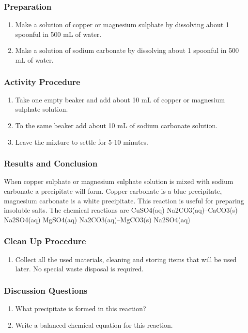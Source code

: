 \subsubsection*{Preparation}
\begin{enumerate}
\item{Make a solution of copper or magnesium sulphate by dissolving about 1 spoonful in 500 mL of water.}
\item{Make a solution of sodium carbonate by dissolving about 1 spoonful in 500 mL of water.}
\end{enumerate}

\subsubsection*{Activity Procedure}
\begin{enumerate}
\item{Take one empty beaker and add about 10 mL of copper or magnesium sulphate solution.}
\item{To the same beaker add about 10 mL of sodium carbonate solution.}
\item{Leave the mixture to settle for 5-10 minutes.}
\end{enumerate}

\subsubsection*{Results and Conclusion}
When copper sulphate or magnesium sulphate solution is mixed with sodium carbonate a precipitate will form. Copper carbonate is a blue precipitate, magnesium carbonate is a white precipitate. This reaction is useful for preparing insoluble salts.
The chemical reactions are 
CuSO4(aq) Na2CO3(aq)--CaCO3(s) Na2SO4(aq)
MgSO4(aq) Na2CO3(aq)--MgCO3(s) Na2SO4(aq)

\subsubsection*{Clean Up Procedure}
\begin{enumerate}
\item{Collect all the used materials, cleaning and storing items that will be used later. No special waste disposal is required.}
\end{enumerate}

\subsubsection*{Discussion Questions}
\begin{enumerate}
\item{What precipitate is formed in this reaction?}
\item{Write a balanced chemical equation for this reaction.}
\end{enumerate}
